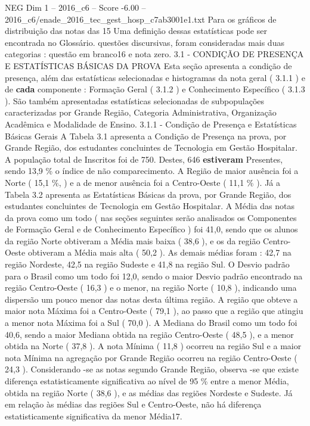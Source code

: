 \begin{textsample}{NEG Dim 1 – 2016\_c6 – Score -6.00 – 2016\_c6/enade\_2016\_tec\_gest\_hosp\_c7ab3001e1.txt}
Para os gráficos de distribuição das notas das 15 Uma definição dessas estatísticas pode ser encontrada no Glossário. questões discursivas, foram consideradas mais duas categorias : questão em branco16 e nota zero. 3.1 - CONDIÇÃO DE PRESENÇA E ESTATÍSTICAS BÁSICAS DA PROVA Esta seção apresenta a condição de presença, além das estatísticas selecionadas e histogramas da nota geral ( 3.1.1 ) e de \textbf{cada} componente : Formação Geral ( 3.1.2 ) e Conhecimento Específico ( 3.1.3 ).
São também apresentadas estatísticas selecionadas de subpopulações caracterizadas por Grande Região, Categoria Administrativa, Organização Acadêmica e Modalidade de Ensino. 3.1.1 - Condição de Presença e Estatísticas Básicas Gerais A Tabela 3.1 apresenta a Condição de Presença na prova, por Grande Região, dos estudantes concluintes de Tecnologia em Gestão Hospitalar.
A população total de Inscritos foi de 750.
Destes, 646 \textbf{estiveram} Presentes, sendo 13,9 \% o índice de não comparecimento.
A Região de maior ausência foi a Norte ( 15,1 \%, ) e a de menor ausência foi a Centro-Oeste ( 11,1 \% ).
Já a Tabela 3.2 apresenta as Estatísticas Básicas da prova, por Grande Região, dos estudantes concluintes de Tecnologia em Gestão Hospitalar.
A Média das notas da prova como um todo ( nas seções seguintes serão analisados os Componentes de Formação Geral e de Conhecimento Específico ) foi 41,0, sendo que os alunos da região Norte obtiveram a Média mais baixa ( 38,6 ), e os da região Centro-Oeste obtiveram a Média mais alta ( 50,2 ).
As demais médias foram : 42,7 na região Nordeste, 42,5 na região Sudeste e 41,8 na região Sul.
O Desvio padrão para o Brasil como um todo foi 12,0, sendo o maior Desvio padrão encontrado na região Centro-Oeste ( 16,3 ) e o menor, na região Norte ( 10,8 ), indicando uma dispersão um pouco menor das notas desta última região.
A região que obteve a maior nota Máxima foi a Centro-Oeste ( 79,1 ), ao passo que a região que atingiu a menor nota Máxima foi a Sul ( 70,0 ).
A Mediana do Brasil como um todo foi 40,6, sendo a maior Mediana obtida na região Centro-Oeste ( 48,5 ), e a menor obtida na Norte ( 37,8 ).
A nota Mínima ( 11,8 ) ocorreu na região Sul e a maior nota Mínima na agregação por Grande Região ocorreu na região Centro-Oeste ( 24,3 ).
Considerando -se as notas segundo Grande Região, observa -se que existe diferença estatisticamente significativa ao nível de 95 \% entre a menor Média, obtida na região Norte ( 38,6 ), e as médias das regiões Nordeste e Sudeste.
Já em relação às médias das regiões Sul e Centro-Oeste, não há diferença estatisticamente significativa da menor Média17.

\end{textsample}

